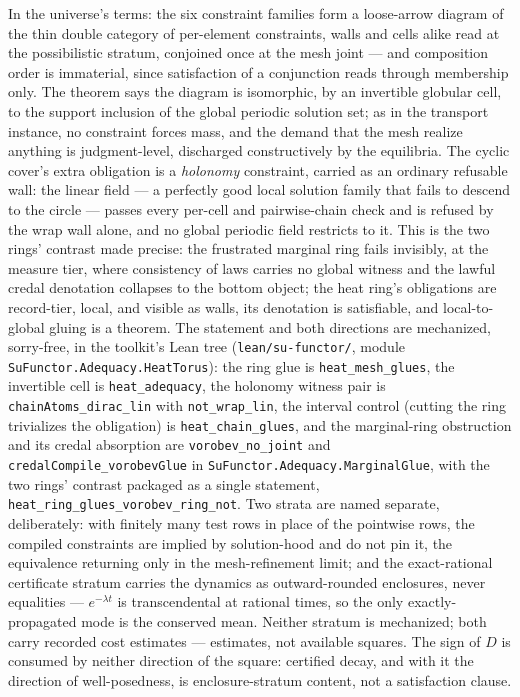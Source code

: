 In the universe's terms: the six constraint families form a
loose-arrow diagram of the thin double category of per-element
constraints, walls and cells alike read at the possibilistic
stratum, conjoined once at the mesh joint --- and composition order
is immaterial, since satisfaction of a conjunction reads through
membership only.  The theorem says the diagram is isomorphic, by an
invertible globular cell, to the support inclusion of the global
periodic solution set; as in the transport instance, no constraint
forces mass, and the demand that the mesh realize anything is
judgment-level, discharged constructively by the equilibria.  The
cyclic cover's extra obligation is a \emph{holonomy} constraint,
carried as an ordinary refusable wall: the linear field --- a
perfectly good local solution family that fails to descend to the
circle --- passes every per-cell and pairwise-chain check and is
refused by the wrap wall alone, and no global periodic field
restricts to it.  This is the two rings' contrast made precise: the
frustrated marginal ring fails invisibly, at the measure tier, where
consistency of laws carries no global witness and the lawful credal
denotation collapses to the bottom object; the heat ring's
obligations are record-tier, local, and visible as walls, its
denotation is satisfiable, and local-to-global gluing is a theorem.
The statement and both directions are mechanized, sorry-free, in the
toolkit's Lean tree (\texttt{lean/su-functor/}, module
\texttt{SuFunctor.Adequacy.HeatTorus}): the ring glue is
\texttt{heat\_mesh\_glues}, the invertible cell is
\texttt{heat\_adequacy}, the holonomy witness pair is
\texttt{chainAtoms\_dirac\_lin} with \texttt{not\_wrap\_lin}, the
interval control (cutting the ring trivializes the obligation) is
\texttt{heat\_chain\_glues}, and the marginal-ring obstruction and
its credal absorption are \texttt{vorobev\_no\_joint} and
\texttt{credalCompile\_vorobevGlue} in
\texttt{SuFunctor.Adequacy.MarginalGlue}, with the two rings'
contrast packaged as a single statement,
\texttt{heat\_ring\_glues\_vorobev\_ring\_not}.  Two strata are named
separate, deliberately: with finitely many test rows in place of the
pointwise rows, the compiled constraints are implied by
solution-hood and do not pin it, the equivalence returning only in
the mesh-refinement limit; and the exact-rational certificate
stratum carries the dynamics as outward-rounded enclosures, never
equalities --- $e^{-\lambda t}$ is transcendental at rational times,
so the only exactly-propagated mode is the conserved mean.  Neither
stratum is mechanized; both carry recorded cost estimates ---
estimates, not available squares.  The sign
of $D$ is consumed by neither direction of the square: certified
decay, and with it the direction of well-posedness, is
enclosure-stratum content, not a satisfaction clause.

